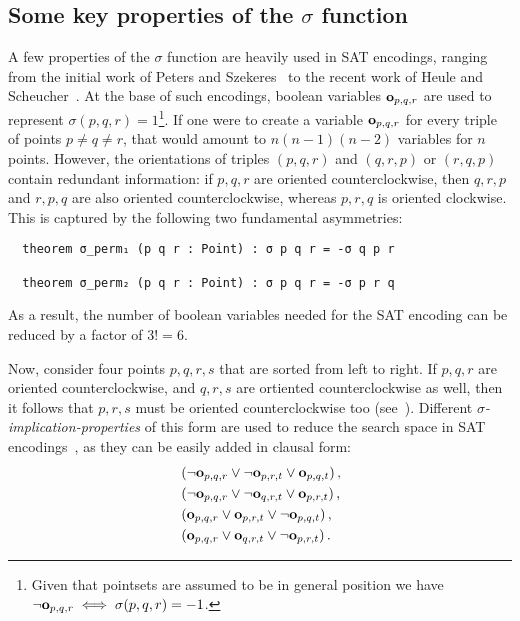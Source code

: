 \subsection{Some key properties of the $\sigma$ function}
A few properties of the $\sigma$ function are heavily used in SAT encodings, ranging from the initial work of Peters and Szekeres~\cite{szekeres_peters_2006} to the recent work of Heule and Scheucher~\cite{emptyHexagonNumber}. At the base of such encodings, boolean variables $\mathbf{o}_{p,q,r}$ are used to represent $\sigma(p, q, r) = 1$\footnote{Given that pointsets are assumed to be in general position we have $\neg \mathbf{o}_{p,q,r} \iff \sigma(p, q, r) = -1$.}. If one were to create a variable $\mathbf{o}_{p,q,r}$ for every triple of points $p \neq q \neq r$, that would amount to $n(n-1)(n-2)$ variables for $n$ points. However, the orientations of triples $(p, q, r)$ and $(q, r, p)$ or $(r, q, p)$ contain redundant information: if $p,q,r$ are oriented counterclockwise, then $q,r,p$ and $r,p,q$ are also oriented counterclockwise, whereas $p,r,q$ is oriented clockwise. This is captured by the following two fundamental asymmetries:
\begin{lstlisting}
  theorem σ_perm₁ (p q r : Point) : σ p q r = -σ q p r

  theorem σ_perm₂ (p q r : Point) : σ p q r = -σ p r q
\end{lstlisting}
As a result, the number of boolean variables needed for the SAT encoding can be reduced by a factor of $3! = 6$.

Now, consider four points $p, q, r, s$ that are sorted from left to right. If $p, q, r$ are oriented counterclockwise, and $q, r, s$ are ortiented counterclockwise as well, then it follows that $p, r, s$ must be oriented counterclockwise too (see~). Different \emph{$\sigma$-implication-properties} of this form are used to reduce the search space in SAT encodings~\cite{emptyHexagonNumber,scheucherTwoDisjoint5holes2020,subercaseaux2023minimizing, szekeres_peters_2006}, as they can be easily added in clausal form:
\begin{align}
  &\left(\neg \mathbf{o}_{p, q, r} \lor \neg \mathbf{o}_{p, r, t} \lor \mathbf{o}_{p, q, t}\right), \\ 
  &\left(\neg \mathbf{o}_{p, q, r} \lor \neg \mathbf{o}_{q, r, t} \lor  \mathbf{o}_{p, r, t}\right),\\
  &\left(\mathbf{o}_{p, q, r} \lor \mathbf{o}_{p, r, t} \lor  \neg \mathbf{o}_{p, q, t}\right), \\
  &\left(\mathbf{o}_{p, q, r} \lor \mathbf{o}_{q, r, t} \lor  \neg \mathbf{o}_{p, r, t}\right). 
\end{align}

